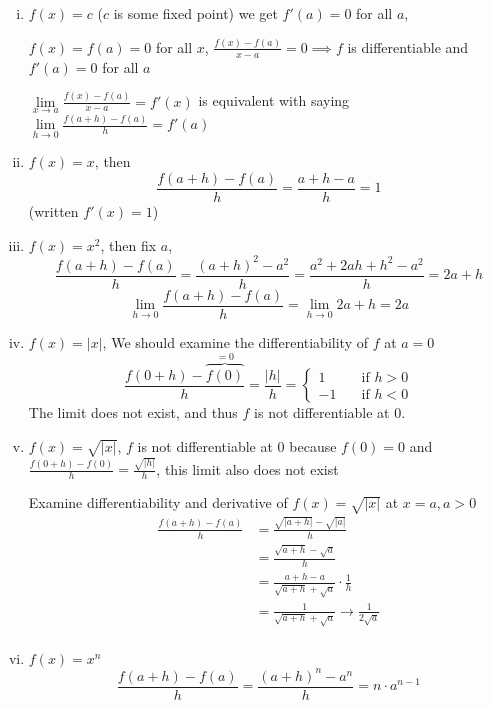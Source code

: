\begin{example*}
  \text{ }
  \begin{enumerate}[(i)]
    \item $f(x) = c$ ($c$ is some fixed point)
      we get $f'(a) = 0$ for all $a$, 

      $f(x) = f(a) = 0$ for all $x$, $\frac{f(x) - f(a)}{x-a} = 0 \implies f$ is differentiable and $f'(a) = 0$ for all $a$

      $\lim\limits_{x \to a} \frac{f(x) - f(a)}{x-a} = f'(x)$ is equivalent with saying $\lim\limits_{h \to 0} \frac{f(a+h) - f(a)}{h} = f'(a)$
    \item $f(x) = x$, then $$\frac{f(a+h) - f(a)}{h} = \frac{a + h - a}{h} = 1$$ (written $f'(x) = 1$)

    \item $f(x) = x^2$, then fix $a$, $$\frac{f(a + h) - f(a)}{h} = \frac{(a+h)^2 - a^2}{h} = \frac{a^2 + 2ah + h^2 - a^2}{h} = 2a + h$$
    $$\lim\limits_{h \to 0} \frac{f(a+h) - f(a)}{h} = \lim\limits_{h \to 0}2a + h = 2a$$
    \item $f(x) = |x|$, We should examine the differentiability of $f$ at \underline{$a = 0$}
    $$\frac{f(0 + h) - \overbrace{f(0)}^{=0}}{h} = \frac{|h|}{h} =\begin{cases}
      1       & \quad \text{if } h > 0\\
      -1  & \quad \text{if } h < 0
    \end{cases}$$
    The limit does not exist, and thus $f$ is not differentiable at $0$.
    \item $f(x) = \sqrt{|x|}$, $f$ is not differentiable at $0$ because $f(0) = 0$ and $\frac{f(0 + h) - f(0)}{h} = \frac{\sqrt{|h|}}{h}$, this limit also does not exist 

    Examine differentiability and derivative of $f(x) = \sqrt{|x|}$ at $x = a, a > 0$
    \begin{align*}
    \frac{f(a + h) - f(a)}{h} &= \frac{\sqrt{|a + h|} - \sqrt{|a|}}{h} \\
    &= \frac{\sqrt{a + h} - \sqrt{a}}{h} \\
    &= \frac{a+h - a}{\sqrt{a + h} + \sqrt{a}}\cdot \frac{1}{h} \\
    &= \frac{1}{\sqrt{a + h} + \sqrt{a}} \to \frac{1}{2\sqrt{a}}\\
    \end{align*}
    \item $f(x) = x^n$ 
    $$\frac{f(a+h) - f(a)}{h} = \frac{(a + h) ^ n - a^n}{h} = n\cdot a^{n-1}$$
  \end{enumerate}
\end{example*}

